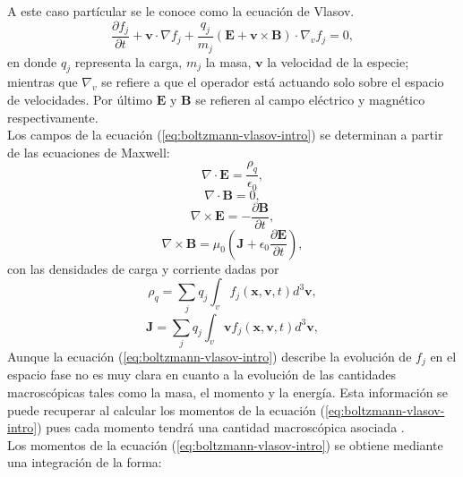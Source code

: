 \documentclass[../tesis_main_file.tex]{subfiles}
\begin{document}
 A este caso partícular se le conoce como la ecuación de Vlasov.
\begin{equation}
\label{eq:boltzmann-vlasov-intro}
\frac{\partial f_j}{\partial t}+ \textbf{v}\cdot \nabla f_j + \frac{q_j}{m_j}\left( \textbf{E} + \textbf{v} \times \textbf{B}\right)\cdot \nabla _v f_j=0,
\end{equation}
en donde $q_j$ representa la carga, $m_j$ la masa, $\textbf{v}$ la velocidad de la especie; mientras que $\nabla _v$ se refiere a que el operador está actuando solo sobre el espacio de velocidades. Por último $\textbf{E}$ y $\textbf{B}$ se refieren al campo eléctrico y magnético respectivamente.\\
Los campos de la ecuación (\ref{eq:boltzmann-vlasov-intro}) se determinan a partir de las ecuaciones de Maxwell:
\begin{equation}
\nabla \cdot \textbf{E}=\frac{\rho_q}{\epsilon _0},
\end{equation}
\begin{equation}
\nabla \cdot \textbf{B}=0,
\end{equation}
\begin{equation}
\nabla \times \textbf{E}=-\frac{\partial \textbf{B}}{\partial t},
\end{equation}
\begin{equation}
\nabla \times \textbf{B} = \mu _0 \left(\textbf{J}+\epsilon_0\frac{\partial \textbf{E}}{\partial t} \right),
\end{equation}
con las densidades de carga y corriente dadas por
\begin{equation}
\rho_q = \sum_j q_j \int_v f_j(\textbf{x},\textbf{v},t) d^3 \textbf{v},
\end{equation}
\begin{equation}
\textbf{J}= \sum_j q_j \int_v \textbf{v}f_j(\textbf{x},\textbf{v},t) d^3 \textbf{v},
\end{equation}
Aunque la ecuación (\ref{eq:boltzmann-vlasov-intro}) describe la evolución de $f_j$ en el espacio fase no es muy clara en cuanto a la evolución de las cantidades macroscópicas tales como la masa, el momento y la energía.
Esta información se puede recuperar al calcular los momentos de la ecuación (\ref{eq:boltzmann-vlasov-intro}) pues cada momento tendrá una cantidad macroscópica asociada .\\
Los momentos de la ecuación (\ref{eq:boltzmann-vlasov-intro}) se obtiene mediante una integración de la forma:
\end{document}
